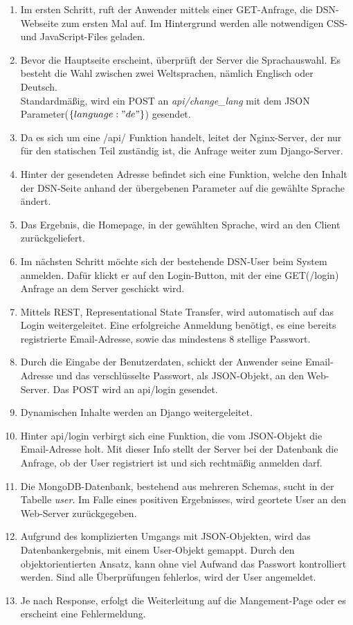 \begin{enumerate}
\item Im ersten Schritt, ruft der Anwender mittels einer GET-Anfrage, die DSN-Webseite zum ersten Mal auf. Im Hintergrund werden alle notwendigen CSS- und JavaScript-Files geladen.
\item Bevor die Hauptseite erscheint, überprüft der Server die Sprachauswahl. Es besteht die Wahl zwischen zwei Weltsprachen, nämlich Englisch oder Deutsch.\\
Standardmäßig, wird ein POST an \textit{api/change\_lang} mit dem JSON Parameter($\{language:"de"\}$) gesendet.
\item Da es sich um eine /api/ Funktion handelt, leitet der Nginx-Server, der nur für den statischen Teil zuständig ist, die Anfrage weiter zum Django-Server.
\item Hinter der gesendeten Adresse befindet sich eine Funktion, welche den Inhalt der DSN-Seite anhand der übergebenen Parameter auf die gewählte Sprache ändert.
\item Das Ergebnis, die Homepage, in der gewählten Sprache, wird an den Client zurückgeliefert.
\item Im nächsten Schritt möchte sich der bestehende DSN-User beim System anmelden. Dafür klickt er auf den Login-Button, mit der eine GET(/login) Anfrage an dem Server geschickt wird.
\item Mittels REST, Representational State Transfer, wird automatisch auf das Login weitergeleitet. Eine erfolgreiche Anmeldung benötigt, es eine bereits registrierte Email-Adresse, sowie das mindestens 8 stellige Passwort.
\item Durch die Eingabe der Benutzerdaten, schickt der Anwender seine Email-Adresse und das verschlüsselte Passwort, als JSON-Objekt, an den Web-Server. Das POST wird an api/login gesendet.
\item Dynamischen Inhalte werden an Django weitergeleitet.
\item Hinter api/login verbirgt sich eine Funktion, die vom JSON-Objekt die Email-Adresse holt. Mit dieser Info stellt der Server bei der Datenbank die Anfrage, ob der User registriert ist und sich rechtmäßig anmelden darf.
\item Die MongoDB-Datenbank, bestehend aus mehreren Schemas, sucht in der Tabelle \textit{user}. Im Falle eines positiven Ergebnisses, wird geortete User an den Web-Server zurückgegeben.
\item Aufgrund des komplizierten Umgangs mit JSON-Objekten, wird das Datenbankergebnis, mit einem User-Objekt gemappt. Durch den objektorientierten Ansatz, kann ohne viel Aufwand das Passwort kontrolliert werden. Sind alle Überprüfungen fehlerlos, wird der User angemeldet.
\item Je nach Response, erfolgt die Weiterleitung auf die Mangement-Page oder es erscheint eine Fehlermeldung.
\end{enumerate}

